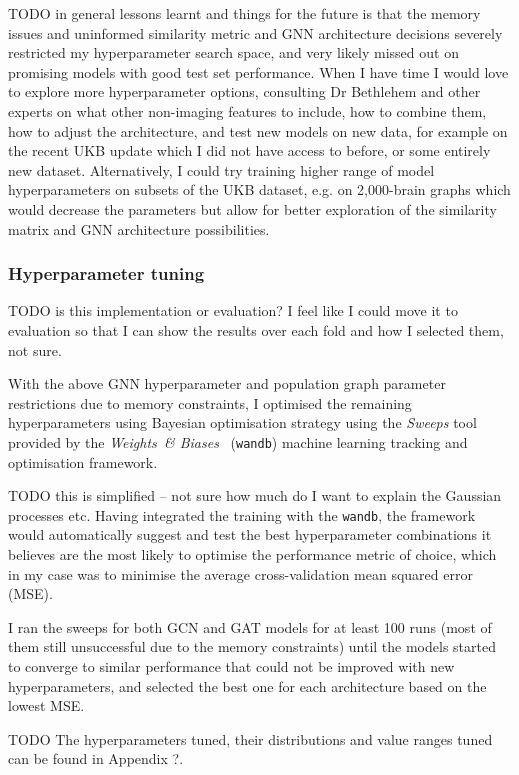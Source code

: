 TODO in general lessons learnt and things for the future is that the memory issues and uninformed similarity metric and GNN architecture decisions severely restricted my hyperparameter search space, and very likely missed out on promising models with good test set performance. When I have time I would love to explore more hyperparameter options, consulting Dr Bethlehem and other experts on what other non-imaging features to include, how to combine them, how to adjust the architecture, and test new models on new data, for example on the recent UKB update which I did not have access to before, or some entirely new dataset. Alternatively, I could try training higher range of model hyperparameters on subsets of the UKB dataset, e.g. on 2,000-brain graphs which would decrease the parameters but allow for better exploration of the similarity matrix and GNN architecture possibilities.


\subsubsection{Hyperparameter tuning}
TODO is this implementation or evaluation? I feel like I could move it to evaluation so that I can show the results over each fold and how I selected them, not sure.

With the above GNN hyperparameter and population graph parameter restrictions due to memory constraints, I optimised the remaining hyperparameters using Bayesian optimisation strategy using the \textit{Sweeps} tool provided by the \textit{Weights~\& Biases}~\cite{wandb} (\texttt{wandb}) machine learning tracking and optimisation framework. 

TODO this is simplified – not sure how much do I want to explain the Gaussian processes etc.
Having integrated the training with the \texttt{wandb}, the framework would automatically suggest and test the best hyperparameter combinations it believes are the most likely to optimise the performance metric of choice, which in my case was to minimise the average cross-validation mean squared error (MSE). 

I ran the sweeps for both GCN and GAT models for at least 100 runs (most of them still unsuccessful due to the memory constraints) until the models started to converge to similar performance that could not be improved with new hyperparameters, and selected the best one for each architecture based on the lowest MSE.

TODO The hyperparameters tuned, their distributions and value ranges tuned can be found in Appendix ?.

